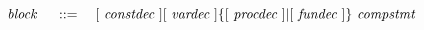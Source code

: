 \[
	~\emph{block}~ \quad ::= \quad 
		[~\emph{constdec}~] [~\emph{vardec}~] \{[~\emph{procdec}~] | [~\emph{fundec}~]\} ~\emph{compstmt}~
\]